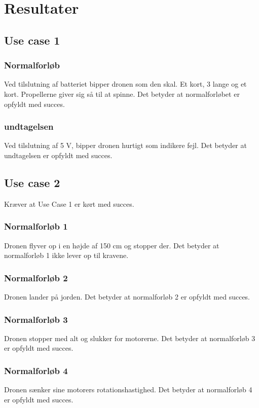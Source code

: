 \documentclass[Main]{subfiles}
\begin{document}
\section{Resultater}

\subsection{Use case 1}
\subsubsection{Normalforløb}
Ved tilslutning af batteriet bipper dronen som den skal. Et kort, 3 lange og et kort. Propellerne giver sig så til at spinne. Det betyder at normalforløbet er opfyldt med succes.

\subsubsection{undtagelsen}
Ved tilslutning af 5 V, bipper dronen hurtigt som indikere fejl.
Det betyder at undtagelsen er opfyldt med succes.

\subsection{Use case 2}

Kræver at Use Case 1 er kørt med succes.

\subsubsection{Normalforløb 1}
Dronen flyver op i en højde af 150 cm og stopper der. 
Det betyder at normalforløb 1 ikke lever op til kravene.

\subsubsection{Normalforløb 2}
Dronen lander på jorden.
Det betyder at normalforløb 2 er opfyldt med succes.

\subsubsection{Normalforløb 3}
Dronen stopper med alt og slukker for motorerne.
Det betyder at normalforløb 3 er opfyldt med succes.

\subsubsection{Normalforløb 4}
Dronen sænker sine motorers rotationshastighed.
Det betyder at normalforløb 4 er opfyldt med succes.
\end{document}
